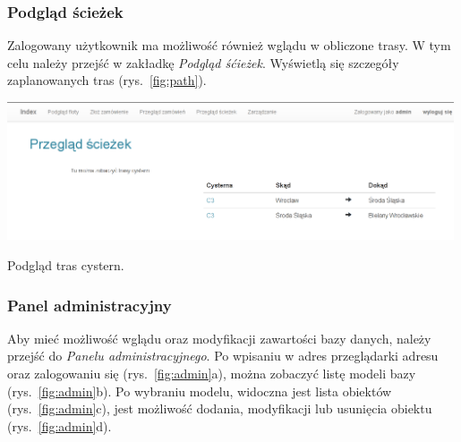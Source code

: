 \documentclass[11pt,a4paper,oneside]{mwart}
\begin{document}
\subsubsection{Podgląd ścieżek}
Zalogowany użytkownik ma możliwość również wglądu w obliczone trasy. W tym celu należy przejść w zakładkę \emph{Podgląd śćieżek}. Wyświetlą się szczegóły zaplanowanych tras (rys.~\ref{fig:path}).
\begin{wykres}[htbp]
  \centering
  \includegraphics[width=0.99\textwidth]{pics/path.png}
  \caption{Podgląd tras cystern.}
  \label{fig:path}
\end{wykres}

\subsubsection{Panel administracyjny}
Aby mieć możliwość wglądu oraz modyfikacji zawartości bazy danych, należy przejść do \emph{Panelu administracyjnego}. Po wpisaniu w adres przeglądarki adresu oraz zalogowaniu się (rys.~\ref{fig:admin}a), można zobaczyć listę modeli bazy (rys.~\ref{fig:admin}b). Po wybraniu modelu, widoczna jest lista obiektów (rys.~\ref{fig:admin}c), jest możliwość dodania, modyfikacji lub usunięcia obiektu (rys.~\ref{fig:admin}d).
\end{document}
